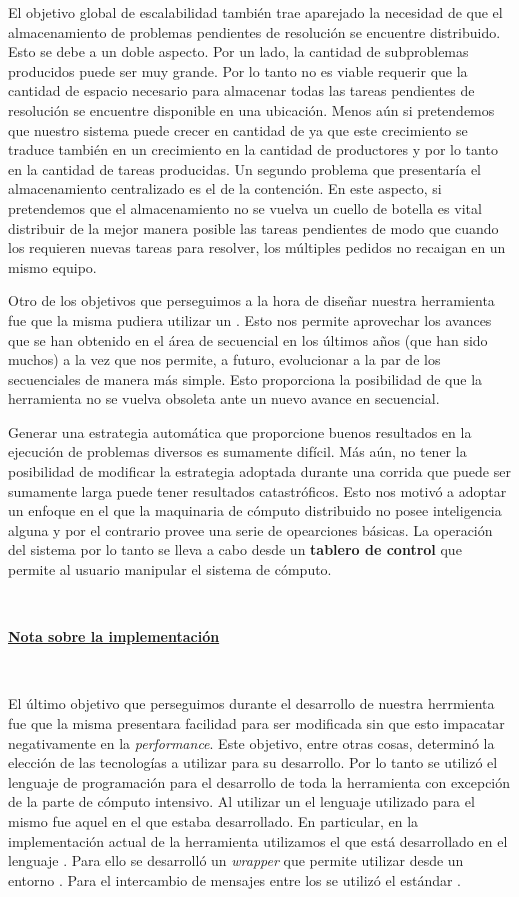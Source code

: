 El objetivo global de escalabilidad también trae aparejado la necesidad de que
el almacenamiento de problemas pendientes de resolución se encuentre
distribuido. Esto se debe a un doble aspecto. Por un lado, la cantidad de
subproblemas producidos puede ser muy grande. Por lo tanto no es viable
requerir que la cantidad de espacio necesario para almacenar todas las tareas
pendientes de resolución se encuentre disponible en una ubicación. Menos aún
si pretendemos que nuestro sistema puede crecer en cantidad de \ws ya que este
crecimiento se traduce también en un crecimiento en la cantidad de productores
y por lo tanto en la cantidad de tareas producidas. Un segundo problema que
presentaría el almacenamiento centralizado es el de la contención. En este
aspecto, si pretendemos que el almacenamiento no se vuelva un cuello de
botella es vital distribuir de la mejor manera posible las tareas pendientes
de modo que cuando los \ws requieren nuevas tareas para resolver, los
múltiples pedidos no recaigan en un mismo equipo.


Otro de los objetivos que perseguimos a la hora de diseñar nuestra herramienta
fue que la misma pudiera utilizar un \ssolver \ots. Esto nos permite
aprovechar los avances que se han obtenido en el área de \ssolving secuencial
en los últimos años (que han sido muchos) a la vez que nos permite, a futuro,
evolucionar a la par de los \ssolvers secuenciales de manera más simple. Esto
proporciona la posibilidad de que la herramienta no se vuelva obsoleta ante un
nuevo avance en \ssolving secuencial.

Generar una estrategia automática que proporcione buenos resultados en la
ejecución de problemas diversos es sumamente difícil. Más aún, no tener la
posibilidad de modificar la estrategia adoptada durante una corrida que puede
ser sumamente larga puede tener resultados catastróficos. Esto nos motivó a
adoptar un enfoque en el que la maquinaria de cómputo distribuido no posee
inteligencia alguna y por el contrario provee una serie de opearciones
básicas. La operación del sistema por lo tanto se lleva a cabo desde un
\textbf{tablero de control} que permite al usuario manipular el sistema de
cómputo.

\

\noindent\underline{\textbf{Nota sobre la implementación}}

\

El último objetivo que perseguimos durante el desarrollo de nuestra herrmienta
fue que la misma presentara facilidad para ser modificada sin que esto
impacatar negativamente en la \emph{performance}. Este objetivo, entre otras
cosas, determinó la elección de las tecnologías a utilizar para su desarrollo.
Por lo tanto se utilizó el lenguaje de programación \Python para el desarrollo
de toda la herramienta con excepción de la parte de cómputo intensivo. Al
utilizar un \ssolver \ots el lenguaje utilizado para el mismo fue aquel en el
que estaba desarrollado. En particular, en la implementación actual de la
herramienta utilizamos el \ssolver \minisatdosveinte que está desarrollado en
el lenguaje \cpp. Para ello se desarrolló un \emph{wrapper} que permite
utilizar \minisat desde un entorno \Python. Para el intercambio de mensajes
entre los \ws se utilizó el estándar \mpi.


